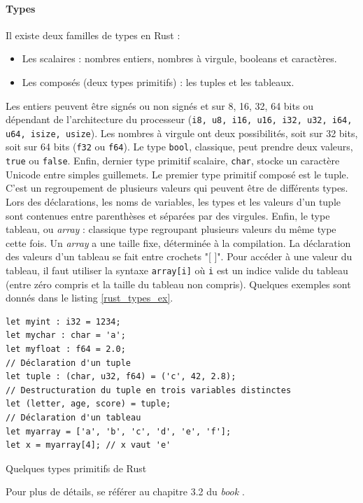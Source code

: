 \paragraph{Types}\label{rust_types}
Il existe deux familles de types en Rust : 
\begin{itemize}
    \item Les scalaires : nombres entiers, nombres à virgule, booleans et caractères.
    \item Les composés (deux types primitifs) : les tuples et les tableaux.
\end{itemize}
Les entiers peuvent être signés ou non signés et sur 8, 16, 32, 64 bits ou dépendant de l'architecture
du processeur (\texttt{i8, u8, i16, u16, i32, u32, i64, u64, isize, usize}). Les nombres 
à virgule ont deux possibilités, soit sur 32 bits, soit sur 64 bits (\texttt{f32} ou 
\texttt{f64}). Le type \texttt{bool}, classique, peut prendre deux valeurs, \texttt{true} 
ou \texttt{false}. Enfin, dernier type primitif scalaire, \texttt{char}, stocke 
un caractère Unicode entre simples guillemets. Le premier type primitif composé est le tuple. C'est 
un regroupement de plusieurs valeurs qui peuvent être de différents types. Lors des déclarations, 
les noms de variables, les types et les valeurs d'un tuple sont contenues entre parenthèses et 
séparées par des virgules. Enfin, le type tableau, ou \textit{array} : classique type regroupant 
plusieurs valeurs du même type cette fois. Un \textit{array} a une taille fixe, déterminée à la 
compilation. La déclaration des valeurs d'un tableau se fait entre crochets "[ ]". Pour accéder à une 
valeur du tableau, il faut utiliser la syntaxe \texttt{array[i]} où \texttt{i} 
est un indice valide du tableau (entre zéro compris et la taille du tableau non compris). Quelques 
exemples sont donnés dans le listing \ref{rust_types_ex}.
\bigbreak
\begin{code}
    \begin{verbatim}
let myint : i32 = 1234;
let mychar : char = 'a';
let myfloat : f64 = 2.0;
// Déclaration d'un tuple
let tuple : (char, u32, f64) = ('c', 42, 2.8);
// Destructuration du tuple en trois variables distinctes
let (letter, age, score) = tuple;
// Déclaration d'un tableau
let myarray = ['a', 'b', 'c', 'd', 'e', 'f'];
let x = myarray[4]; // x vaut 'e'
    \end{verbatim}
    \caption{Quelques types primitifs de Rust}
    \label{rust_types_ex}
\end{code}
\bigbreak
Pour plus de détails, se référer au chapitre 3.2 du \textit{book} \cite{ref0}.

